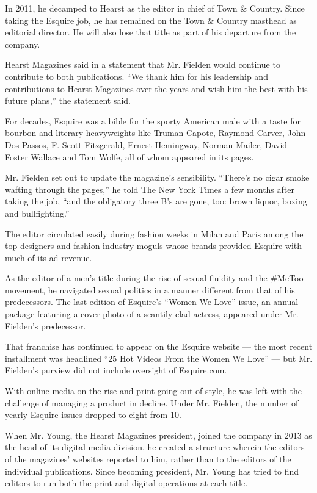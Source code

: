 In 2011, he decamped to Hearst as the editor in chief of Town \&
Country. Since taking the Esquire job, he has remained on the Town \&
Country masthead as editorial director. He will also lose that title as
part of his departure from the company.

Hearst Magazines said in a statement that Mr. Fielden would continue to
contribute to both publications. ``We thank him for his leadership and
contributions to Hearst Magazines over the years and wish him the best
with his future plans,'' the statement said.

For decades, Esquire was a bible for the sporty American male with a
taste for bourbon and literary heavyweights like Truman Capote, Raymond
Carver, John Dos Passos, F. Scott Fitzgerald, Ernest Hemingway, Norman
Mailer, David Foster Wallace and Tom Wolfe, all of whom appeared in its
pages.

Mr. Fielden set out to update the magazine's sensibility. ``There's no
cigar smoke wafting through the pages,'' he told The New York Times a
few months after taking the job, ``and the obligatory three B's are
gone, too: brown liquor, boxing and bullfighting.''

The editor circulated easily during fashion weeks in Milan and Paris
among the top designers and fashion-industry moguls whose brands
provided Esquire with much of its ad revenue.

As the editor of a men's title during the rise of sexual fluidity and
the \#MeToo movement, he navigated sexual politics in a manner different
from that of his predecessors. The last edition of Esquire's ``Women We
Love'' issue, an annual package featuring a cover photo of a scantily
clad actress, appeared under Mr. Fielden's predecessor.

That franchise has continued to appear on the Esquire website --- the
most recent installment was headlined ``25 Hot Videos From the Women We
Love'' --- but Mr. Fielden's purview did not include oversight of
Esquire.com.

With online media on the rise and print going out of style, he was left
with the challenge of managing a product in decline. Under Mr. Fielden,
the number of yearly Esquire issues dropped to eight from 10.

When Mr. Young, the Hearst Magazines president, joined the company in
2013 as the head of its digital media division, he created a structure
wherein the editors of the magazines' websites reported to him, rather
than to the editors of the individual publications. Since becoming
president, Mr. Young has tried to find editors to run both the print and
digital operations at each title.

